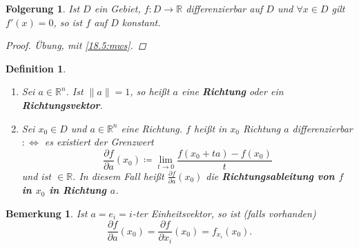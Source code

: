 \documentclass[12pt]{extreport} %
\newcommand{\R}{\mathbb{R}}
\theoremstyle{named}
\theoremstyle{nnamed}
\theoremstyle{itshape}
\newtheorem*{definition}{Definition}
\theoremstyle{normal}
\newtheorem{folgerung}[unnamedtheorem]{Folgerung}
\newtheorem*{bemerkung}{Bemerkung}
\begin{document}
\begin{folgerung} \label{18.6:folg}
	Ist $D$ ein Gebiet, $f \colon D \rightarrow \R$ differenzierbar auf $D$ und $\forall x \in D$ gilt $f'(x) = 0$, so ist $f$ auf $D$ konstant.
	
	\begin{proof}
		Übung, mit \ref{18.5:mws}.
	\end{proof}
\end{folgerung}

   
\begin{definition} ~\
	\begin{enumerate}
		\item Sei $a \in \R^{n}$. Ist $\| a \| = 1$, so hei{\ss}t $a$ eine \textbf{Richtung} oder ein \textbf{Richtungsvektor}.
		\item Sei $x_{0} \in D$ und $a \in \R^{n}$ eine Richtung. $f$ hei{\ss}t in $x_{0}$ Richtung $a$ differenzierbar $: \iff$ es existiert der Grenzwert
		$$ \frac{\partial f}{\partial a}(x_{0}) \coloneqq \lim_{t \rightarrow 0} \frac{f(x_{0} + t a ) - f(x_{0})}{t} $$
		und ist $\in \R$. In diesem Fall hei{\ss}t $\frac{\partial f}{\partial a}(x_{0})$ die \textbf{Richtungsableitung von $f$ in $x_{0}$ in Richtung $a$}.
	\end{enumerate}
\end{definition}


\begin{bemerkung}
	Ist $a = e_{i} = i$-ter Einheitsvektor, so ist (falls vorhanden)
		$$ \frac{\partial f}{\partial a} (x_{0}) = \frac{\partial f}{\partial x_{i}}(x_{0}) = f_{x_{i}}(x_{0}). $$
\end{bemerkung}
\end{document}
